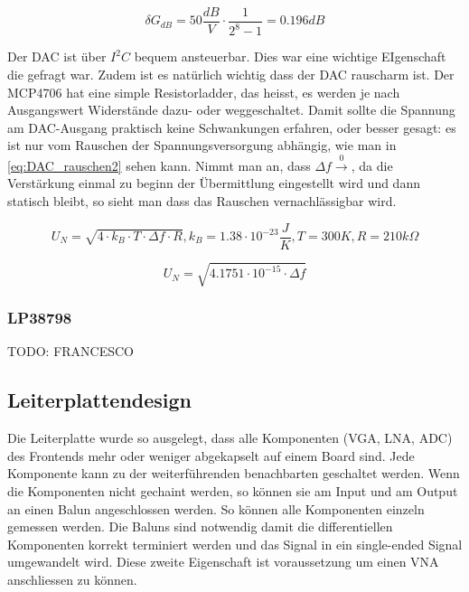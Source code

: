 \begin{equation}
    \delta G_{dB} = 50 \frac{dB}{V} \cdot \frac{1}{2^8 - 1} = 0.196 dB
\label{eq:DAC_wert}
\end{equation}

Der DAC ist über $I^2 C$ bequem ansteuerbar. Dies war eine wichtige EIgenschaft die gefragt war. Zudem ist es natürlich wichtig dass der DAC rauscharm ist. Der MCP4706 hat eine simple Resistorladder, das heisst, es werden je nach Ausgangswert Widerstände dazu- oder weggeschaltet. Damit sollte die Spannung am DAC-Ausgang praktisch keine Schwankungen erfahren, oder besser gesagt: es ist nur vom Rauschen der Spannungsversorgung abhängig, wie man in \ref{eq:DAC_rauschen2} sehen kann. Nimmt man an, dass $\Delta f \xrightarrow 0$, da die Verstärkung einmal zu beginn der Übermittlung eingestellt wird und dann statisch bleibt, so sieht man dass das Rauschen vernachlässigbar wird.

\begin{equation}
    U_N = \sqrt{4 \cdot k_B \cdot T \cdot \Delta f \cdot R}, k_B = 1.38\cdot 10^{-23}\frac{J}{K}, T = 300K, R = 210k\Omega
\label{eq:DAC_rauschen}
\end{equation}

\begin{equation}
    U_N = \sqrt{4.1751\cdot 10^{-15} \cdot \Delta f}
\label{eq:DAC_rauschen2}
\end{equation}

\subsubsection{LP38798}
TODO: FRANCESCO

\subsection{Leiterplattendesign}
\label{subsec:Leiterplattendesign}
Die Leiterplatte wurde so ausgelegt, dass alle Komponenten (VGA, LNA, ADC) des Frontends mehr oder weniger abgekapselt auf einem Board sind. Jede Komponente kann zu der weiterführenden benachbarten geschaltet werden. Wenn die Komponenten nicht gechaint werden, so können sie am Input und am Output an einen Balun angeschlossen werden. So können alle Komponenten einzeln gemessen werden. Die Baluns sind notwendig damit die differentiellen Komponenten korrekt terminiert werden und das Signal in ein single-ended Signal umgewandelt wird. Diese zweite Eigenschaft ist voraussetzung um einen VNA anschliessen zu können.

